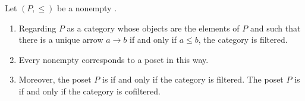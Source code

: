 \begin{lemma} \label{lemma:posets_correspond_to_small_filtered_thin_categories}
    Let $(P, \leq)$ be a nonempty . 
    \begin{enumerate}
        \item Regarding $P$ as a category whose objects are the elements of $P$ and such that there is a unique arrow $a \to b$ if and only if $a \leq b$, the category is filtered. 
        \item Every nonempty    corresponds to a poset in this way.
        \item Moreover, the poset $P$ is  if and only if the category is filtered. The poset $P$ is  if and only if the category is cofiltered.
    \end{enumerate}
\end{lemma}
